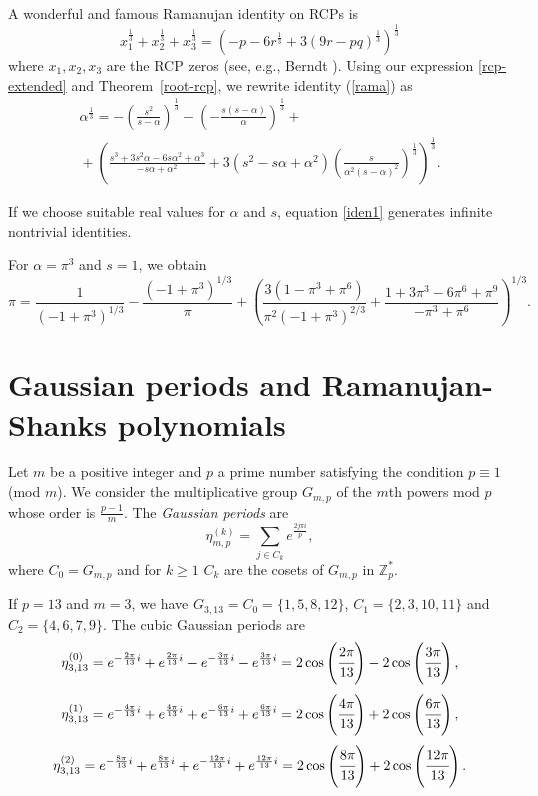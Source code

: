 \documentclass[12pt,reqno]{article}
\begin{document}
A wonderful and famous Ramanujan identity on RCPs is 
\begin{equation} \label{rama} x_1^{\frac{1}{3}}+x_2^{\frac{1}{3}}+x_3^{\frac{1}{3}}=\left(-p-6r^{\frac{1}{3}}+3(9r-pq)^{\frac{1}{3}}\right)^{\frac{1}{3}} \end{equation}
where $x_1,x_2,x_3$ are the RCP zeros (see, e.g., Berndt \cite[p.\ 22]{Br}). Using our expression \eqref{rcp-extended} and Theorem~\ref{root-rcp}, we rewrite identity (\ref{rama}) as
\begin{multline} \label{iden1}
\alpha^{\frac{1}{3}}=-\left(\frac{s^2}{s-\alpha}\right)^{\frac{1}{3}}-\left(-\frac{s(s-\alpha)}{\alpha}\right)^{\frac{1}{3}}{}+\\
{}+\left(\frac{s^3+3 s^2 \alpha-6 s \alpha^2+\alpha^3}{-s \alpha+\alpha^2}+3\left(s^2-s \alpha+\alpha^2\right)\left(\frac{s }{\alpha^2 (s-\alpha)^2}\right)^{\frac{1}{3}}\right)^{\frac{1}{3}}.
\end{multline}

If we choose suitable real values for $\alpha$ and $s$,  equation \eqref{iden1} generates infinite nontrivial identities.
\begin{example}
For $\alpha=\pi^3$ and $s=1$, we obtain
$$\pi = \frac{1}{\left(-1+\pi ^3\right)^{1/3}}-\frac{\left(-1+\pi ^3\right)^{1/3}}{\pi }+\left(\frac{3 \left(1-\pi ^3+\pi ^6\right)}{\pi ^2 \left(-1+\pi ^3\right)^{2/3}}+\frac{1+3 \pi ^3-6 \pi ^6+\pi ^9}{-\pi ^3+\pi ^6}\right)^{1/3}.
$$
\end{example}

\section{Gaussian periods and Ramanujan-Shanks polynomials}

\begin{definition}
Let $m$ be a positive integer and $p$ a prime number satisfying the condition $p\equiv 1$ (mod $m$). We consider the multiplicative group $G_{m,p}$ of the $m$th powers mod $p$ whose order is $\frac{p-1}{m}$. The \emph{Gaussian periods} are
$$\eta_{m,p}^{(k)}=\sum_{j\in C_k}e^{\frac{2j\pi i}{p}},$$
where $C_0=G_{m,p}$ and for $k\geq 1$ $C_k$ are the cosets of $G_{m,p}$ in $\mathbb Z_p^*$. 
\end{definition}
\begin{example}
If $p=13$ and $m=3$, we have $G_{3,13}=C_0=\{1,5,8,12\}$, $C_1=\{2,3,10,11\}$ and $C_2=\{4,6,7,9\}$. The cubic Gaussian periods are
$$\eta_{3,13}^{(0)}=e^{-\frac{2\pi}{13}i}+e^{\frac{2\pi}{13}i}-e^{-\frac{3\pi}{13}i}-e^{\frac{3\pi}{13}i}=2\cos\left( \cfrac{2\pi}{13} \right)- 2\cos\left( \cfrac{3\pi}{13} \right),$$
$$\eta_{3,13}^{(1)}=e^{-\frac{4\pi}{13}i}+e^{\frac{4\pi}{13}i}+e^{-\frac{6\pi}{13}i}+e^{\frac{6\pi}{13}i}=2\cos\left( \cfrac{4\pi}{13} \right)+ 2\cos\left( \cfrac{6\pi}{13} \right),$$
$$\eta_{3,13}^{(2)}=e^{-\frac{8\pi}{13}i}+e^{\frac{8\pi}{13}i}+e^{-\frac{12\pi}{13}i}+e^{\frac{12\pi}{13}i}=2\cos\left( \cfrac{8\pi}{13} \right)+ 2\cos\left( \cfrac{12\pi}{13} \right).$$
\end{example}
\end{document}
